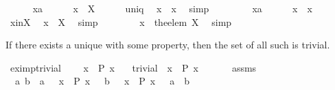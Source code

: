 \begin{isabellebody}
\ \ \ \ \isamarkupfalse%
\ x{\isacharprime}{\isacharcolon}{\isacharcolon}{\isacharprime}a\isanewline
\ \ \ \ \isamarkupfalse%
\ {\isachardoublequoteopen}x{\isacharprime}\ {\isasymin}\ X{\isachardoublequoteclose}\isanewline
\ \ \ \ \isamarkupfalse%
\ uniq\ \isamarkupfalse%
\ {\isachardoublequoteopen}x{\isacharprime}\ {\isasymin}\ {\isacharbraceleft}x{\isacharbraceright}{\isachardoublequoteclose}\ \isamarkupfalse%
\ simp\isanewline
\ \ \isamarkupfalse%
\isanewline
\ \ \ \ \isamarkupfalse%
\ x{\isacharprime}{\isacharcolon}{\isacharcolon}{\isacharprime}a\isanewline
\ \ \ \ \isamarkupfalse%
\ {\isachardoublequoteopen}x{\isacharprime}\ {\isasymin}\ {\isacharbraceleft}x{\isacharbraceright}{\isachardoublequoteclose}\isanewline
\ \ \ \ \isamarkupfalse%
\ x{\isacharunderscore}in{\isacharunderscore}X\ \isamarkupfalse%
\ {\isachardoublequoteopen}x{\isacharprime}\ {\isasymin}\ X{\isachardoublequoteclose}\ \isamarkupfalse%
\ simp\isanewline
\ \ \isamarkupfalse%
\isanewline
\ \ \isamarkupfalse%
\ \isamarkupfalse%
\ {\isachardoublequoteopen}x\ {\isasymin}\ {\isacharbraceleft}the{\isacharunderscore}elem\ X{\isacharbraceright}{\isachardoublequoteclose}\ \isamarkupfalse%
\ simp\isanewline
{}\isamarkupfalse%
%
\endisatagproof
{\isafoldproof}%
%
\isadelimproof
%
\endisadelimproof
%
\begin{isamarkuptext}%
If there exists a unique  with some property, then the set 
  of all such  is trivial.%
\end{isamarkuptext}%
\isamarkuptrue%
\isamarkupfalse%
\ ex{}{\isacharunderscore}imp{\isacharunderscore}trivial{\isacharcolon}\isanewline
\ \ \ {\isachardoublequoteopen}{\isasymexists}{\isacharbang}\ x\ {\isachardot}\ P\ x{\isachardoublequoteclose}\isanewline
\ \ \ {\isachardoublequoteopen}trivial\ {\isacharbraceleft}\ x\ {\isachardot}\ P\ x\ {\isacharbraceright}{\isachardoublequoteclose}\isanewline
%
\isadelimproof
%
\endisadelimproof
%
\isatagproof
{}\isamarkupfalse%
\ {\isacharminus}\isanewline
\ \ \isamarkupfalse%
\ assms\ \isamarkupfalse%
\ {\isachardoublequoteopen}{\isasymforall}\ a\ b\ {\isachardot}\ a\ {\isasymin}\ {\isacharbraceleft}\ x\ {\isachardot}\ P\ x\ {\isacharbraceright}\ {\isasymand}\ b\ {\isasymin}\ {\isacharbraceleft}\ x\ {\isachardot}\ P\ x\ {\isacharbraceright}\ {\isasymlongrightarrow}\ a\ {\isacharequal}\ b{\isachardoublequoteclose}\ \isamarkupfalse%

\end{isabellebody}
